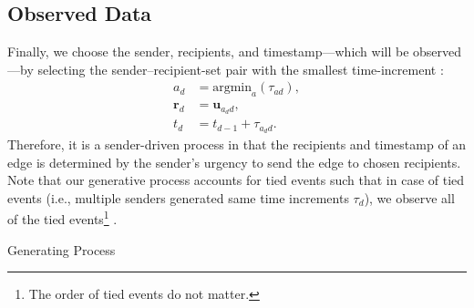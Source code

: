 \documentclass[12pt]{article}
\begin{document}
\subsection{Observed Data}\label{subsec:Observed}
Finally, we choose the sender, recipients, and timestamp---which will be observed---by selecting the sender--recipient-set pair with the smallest time-increment \cite{snijders1996stochastic}:
\begin{equation}
\begin{aligned}
a_d &= \mbox{argmin}_{a}(\tau_{ad}),\\
\boldsymbol{r}_d &= \boldsymbol{u}_{a_d d},\\
t_d &=t_{d-1} + \tau_{a_d d}.
\end{aligned}
\end{equation}
Therefore, it is a sender-driven process in that the recipients and timestamp of an edge is determined by the sender's urgency to send the edge to chosen recipients. Note that  our generative process accounts for tied events such that in case of tied events (i.e., multiple senders generated same time increments $\tau_d$), we observe all of the tied events\footnote{The order of tied events do not matter.} .
	\begin{algorithm}[H]
		\SetAlgoLined
		\caption{Generating Process}
			\label{alg:generative}
		\end{algorithm}
\end{document}
